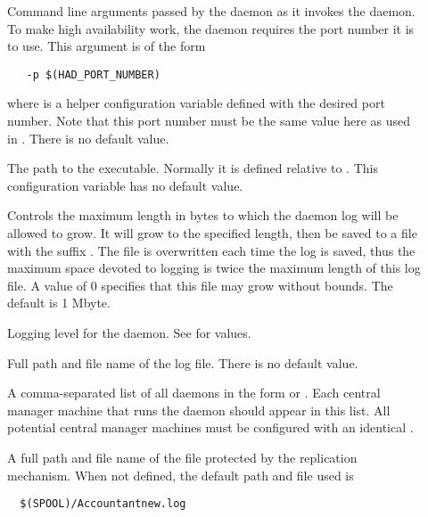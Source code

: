 \begin{description}
\item[]
  \label{param:HADArgs}
  Command line arguments passed by the  daemon
  as it invokes the  daemon.
  To make high availability work, the  daemon
  requires the port number it is to use.
  This argument is of the form
  \begin{verbatim}
   -p $(HAD_PORT_NUMBER)
  \end{verbatim}
  where  is a helper configuration variable
  defined with the desired port number.
  Note that this port number must be the same value here as
  used in .
  There is no default value.


\item[]
  \label{param:HAD}
  The path to the  executable. Normally it is defined
  relative to .
  This configuration variable has no default value.

\item[]
  \label{param:MaxHADLog}
  Controls the maximum length in bytes to which the 
  daemon log will be allowed to grow. It will grow to the specified length,
  then be saved to a file with the suffix . 
  The   file is overwritten each time the log is saved,
  thus the maximum space devoted to logging is twice the maximum length
  of this log file.
  A value of 0 specifies that this file may grow without bounds.
  The default is 1 Mbyte.

\item[]
  \label{param:HADDebug}
  Logging level for the  daemon.
  See  for values.

\item[]
  \label{param:HADLog}
  Full path and file name of the log file.
  There is no default value.

\item[]
  \label{param:ReplicationList}
  A comma-separated list of all  daemons
  in the form  or .
  Each central manager machine that runs the  daemon
  should appear in this list.
  All potential central manager machines must be configured with
  an identical .

\item[]
  \label{param:StateFile}
  A full path and file name of the file protected by the replication
  mechanism.
  When not defined, the default path and file used is
  \begin{verbatim}
  $(SPOOL)/Accountantnew.log
  \end{verbatim}


\end{description}
